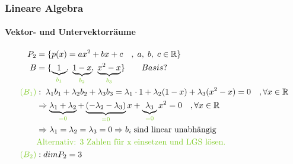 \documentclass[12pt,a4paper]{article}%
\numberwithin{equation}{section}
\newcommand{\R}{\mathbb{R}} %
\newcommand{\subsubsubsection}{\paragraph}
\def\colGreen#1{\begingroup\color{LimeGreen}{#1}\endgroup}
\def\ubGreen#1#2{\underbrace{#2}_{\colGreen{#1}}}
\numberwithin{equation}{subsection}
\begin{document}
	  \subsubsection{Lineare Algebra}
	    \subsubsubsection{Vektor- und Untervektorräume}
	    \begin{align}
	      P_2 &= \lbrace p(x) = ax^2 + bx + c \quad ,\;a,\;b,\;c \in \R \rbrace \nonumber\\
	      B &= \lbrace  \ubGreen{b_1}{1},\; \ubGreen{b_2}{1-x} ,\; \ubGreen{b_3}{x^2-x} \rbrace \qquad Basis? \nonumber \\
	      \colGreen{(B_1)}&:\; \lambda_1 b_1 + \lambda_2 b_2 + \lambda_3 b_3 = \lambda_1 \cdot 1 + \lambda_2 (1-x) + \lambda_3 (x^2 -x) = 0 \quad ,\forall x \in \R
	      \nonumber \\
	      &\Rightarrow \ubGreen{=0}{\lambda_1 + \lambda_2} + \ubGreen{=0}{(-\lambda_2 - \lambda_3)}x+\ubGreen{=0}{\lambda_3}x^2 = 0 \quad ,\forall x \in \R
	      \nonumber \\
	      &\Rightarrow \lambda_1 = \lambda_2 = \lambda_3 = 0 \Rightarrow b_i \; \text{sind linear unabhängig} \nonumber \\
	      &\colGreen{\text{Alternativ: 3 Zahlen für x einsetzen und LGS lösen.}}
	      \\
	      \colGreen{(B_2)}&: dim P_2 = 3
	    \end{align}
\end{document}
